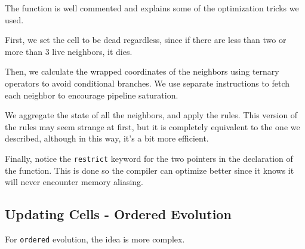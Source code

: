 \documentclass{report}
\begin{document}
The function is well commented and explains some of the optimization tricks we used. 

First, we set the cell to be dead regardless, since 
if there are less than two or more than 3 live neighbors, it dies.

Then, we calculate the wrapped coordinates of the neighbors using ternary operators to avoid 
conditional branches. We use separate instructions to fetch each neighbor to encourage pipeline 
saturation.

We aggregate the state of all the neighbors, and apply the rules. 
This version of the rules may seem strange at first, but it is completely 
equivalent to the one we described, although in this way, it's a bit more efficient.

Finally, notice the \texttt{restrict} keyword for the two pointers in the declaration 
of the function. This is done so the compiler can optimize better since it knows
it will never encounter memory aliasing.

\subsection{Updating Cells - Ordered Evolution}

For \texttt{ordered} evolution, the idea is more complex.   
\end{document}

